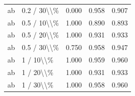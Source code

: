 \begin{table}[!h]
\begin{tabular}[t]{llccc}
\addlinespace
ab & 0.2 / 30\textbackslash{}\textbackslash{}\% & 0.000 & 0.958 & 0.907\\
ab & 0.5 / 10\textbackslash{}\textbackslash{}\% & 1.000 & 0.890 & 0.893\\
ab & 0.5 / 20\textbackslash{}\textbackslash{}\% & 1.000 & 0.931 & 0.933\\
ab & 0.5 / 30\textbackslash{}\textbackslash{}\% & 0.750 & 0.958 & 0.947\\
ab & 1 / 10\textbackslash{}\textbackslash{}\% & 1.000 & 0.959 & 0.960\\
\addlinespace
ab & 1 / 20\textbackslash{}\textbackslash{}\% & 1.000 & 0.931 & 0.933\\
ab & 1 / 30\textbackslash{}\textbackslash{}\% & 1.000 & 0.958 & 0.960\\
\bottomrule
\end{tabular}
\end{table}
